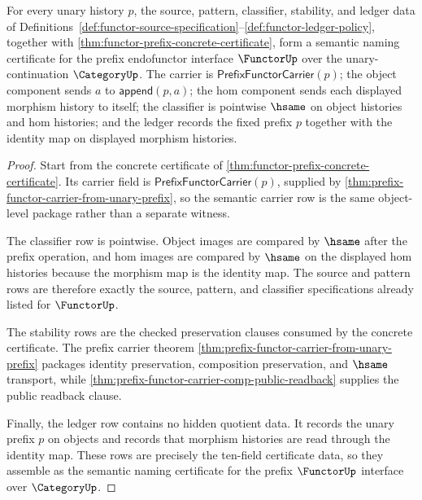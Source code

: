 \begin{theorem}
\label{thm:functor-prefix-semantic-namecert}
For every unary history $p$, the source, pattern, classifier, stability, and
ledger data of
Definitions~\ref{def:functor-source-specification}--\ref{def:functor-ledger-policy},
together with \autoref{thm:functor-prefix-concrete-certificate}, form a
semantic naming certificate for the prefix endofunctor interface $\FunctorUp$
over the unary-continuation $\CategoryUp$. The carrier is
$\mathsf{PrefixFunctorCarrier}(p)$; the object component sends $a$ to
$\mathsf{append}(p,a)$; the hom component sends each displayed morphism history
to itself; the classifier is pointwise $\hsame$ on object histories and hom
histories; and the ledger records the fixed prefix $p$ together with the
identity map on displayed morphism histories.
\end{theorem}
\begin{proof}
Start from the concrete certificate of
\autoref{thm:functor-prefix-concrete-certificate}. Its carrier field is
$\mathsf{PrefixFunctorCarrier}(p)$, supplied by
\autoref{thm:prefix-functor-carrier-from-unary-prefix}, so the semantic carrier
row is the same object-level package rather than a separate witness.

The classifier row is pointwise. Object images are compared by $\hsame$ after
the prefix operation, and hom images are compared by $\hsame$ on the displayed
hom histories because the morphism map is the identity map. The source and
pattern rows are therefore exactly the source, pattern, and classifier
specifications already listed for $\FunctorUp$.

The stability rows are the checked preservation clauses consumed by the
concrete certificate. The prefix carrier theorem
\autoref{thm:prefix-functor-carrier-from-unary-prefix} packages identity
preservation, composition preservation, and $\hsame$ transport, while
\autoref{thm:prefix-functor-carrier-comp-public-readback} supplies the public
readback clause.

Finally, the ledger row contains no hidden quotient data. It records the unary
prefix $p$ on objects and records that morphism histories are read through the
identity map. These rows are precisely the ten-field certificate data, so they
assemble as the semantic naming certificate for the prefix $\FunctorUp$
interface over $\CategoryUp$.
\end{proof}

